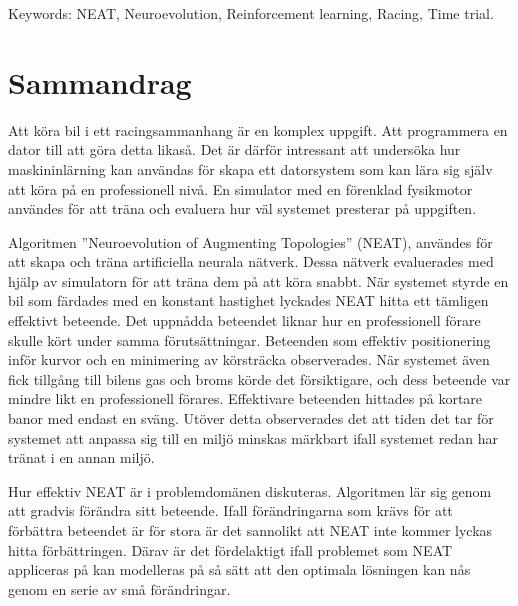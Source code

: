 \vfill
Keywords: NEAT, Neuroevolution, Reinforcement learning, Racing, Time trial.

\newpage				%
\thispagestyle{empty}
\mbox{}

\newpage
\thispagestyle{empty}
\section*{\centering Sammandrag}
Att köra bil i ett racingsammanhang är en komplex uppgift. Att programmera en dator till att göra detta likaså. Det är därför intressant att undersöka hur maskininlärning kan användas för skapa ett datorsystem som kan lära sig själv att köra på en professionell nivå. En simulator med en förenklad fysikmotor användes för att träna och evaluera hur väl systemet presterar på uppgiften. 

Algoritmen ”Neuroevolution of Augmenting Topologies” (NEAT), användes för att skapa och träna artificiella neurala nätverk. Dessa nätverk evaluerades med hjälp av simulatorn för att träna dem på att köra snabbt. När systemet styrde en bil som färdades med en konstant hastighet lyckades NEAT hitta ett tämligen effektivt beteende. Det uppnådda beteendet liknar hur en professionell förare skulle kört under samma förutsättningar. Beteenden som effektiv positionering inför kurvor och en minimering av körsträcka observerades. När systemet även fick tillgång till bilens gas och broms körde det försiktigare, och dess beteende var mindre likt en professionell förares. Effektivare beteenden hittades på kortare banor med endast en sväng. Utöver detta observerades det att tiden det tar för systemet att anpassa sig till en miljö minskas märkbart ifall systemet redan har tränat i en annan miljö. 

Hur effektiv NEAT är i problemdomänen diskuteras. Algoritmen lär sig genom att gradvis förändra sitt beteende. Ifall förändringarna som krävs för att förbättra beteendet är för stora är det sannolikt att NEAT inte kommer lyckas hitta förbättringen. Därav är det fördelaktigt ifall problemet som NEAT appliceras på kan modelleras på så sätt att den optimala lösningen kan nås genom en serie av små förändringar. 





\newpage				%
\thispagestyle{empty}
\mbox{}


